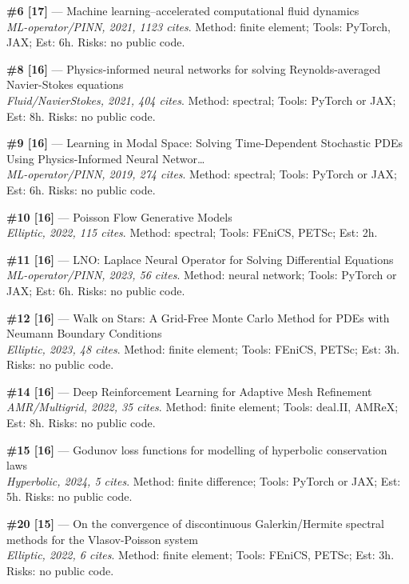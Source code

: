\documentclass[10pt,letterpaper]{article}
\begin{document}
\textbf{\#6 [17]} — Machine learning–accelerated computational fluid dynamics \\
\textit{ML-operator/PINN, 2021, 1123 cites}. Method: finite element; Tools: PyTorch, JAX; Est: 6h. Risks: no public code.

\textbf{\#8 [16]} — Physics-informed neural networks for solving Reynolds-averaged Navier-Stokes equations \\
\textit{Fluid/NavierStokes, 2021, 404 cites}. Method: spectral; Tools: PyTorch or JAX; Est: 8h. Risks: no public code.

\textbf{\#9 [16]} — Learning in Modal Space: Solving Time-Dependent Stochastic PDEs Using Physics-Informed Neural Networ… \\
\textit{ML-operator/PINN, 2019, 274 cites}. Method: spectral; Tools: PyTorch or JAX; Est: 6h. Risks: no public code.

\textbf{\#10 [16]} — Poisson Flow Generative Models \\
\textit{Elliptic, 2022, 115 cites}. Method: spectral; Tools: FEniCS, PETSc; Est: 2h.

\textbf{\#11 [16]} — LNO: Laplace Neural Operator for Solving Differential Equations \\
\textit{ML-operator/PINN, 2023, 56 cites}. Method: neural network; Tools: PyTorch or JAX; Est: 6h. Risks: no public code.

\textbf{\#12 [16]} — Walk on Stars: A Grid-Free Monte Carlo Method for PDEs with Neumann Boundary Conditions \\
\textit{Elliptic, 2023, 48 cites}. Method: finite element; Tools: FEniCS, PETSc; Est: 3h. Risks: no public code.

\textbf{\#14 [16]} — Deep Reinforcement Learning for Adaptive Mesh Refinement \\
\textit{AMR/Multigrid, 2022, 35 cites}. Method: finite element; Tools: deal.II, AMReX; Est: 8h. Risks: no public code.

\textbf{\#15 [16]} — Godunov loss functions for modelling of hyperbolic conservation laws \\
\textit{Hyperbolic, 2024, 5 cites}. Method: finite difference; Tools: PyTorch or JAX; Est: 5h. Risks: no public code.

\textbf{\#20 [15]} — On the convergence of discontinuous Galerkin/Hermite spectral methods for the Vlasov-Poisson system \\
\textit{Elliptic, 2022, 6 cites}. Method: finite element; Tools: FEniCS, PETSc; Est: 3h. Risks: no public code.
\end{document}
